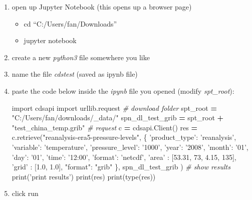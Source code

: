 \documentclass[
]{book}
\newenvironment{Shaded}{\begin{snugshade}}{\end{snugshade}}
\newcommand{\BuiltInTok}[1]{#1}
\newcommand{\CommentTok}[1]{\textcolor[rgb]{0.56,0.35,0.01}{\textit{#1}}}
\newcommand{\DecValTok}[1]{\textcolor[rgb]{0.00,0.00,0.81}{#1}}
\newcommand{\FloatTok}[1]{\textcolor[rgb]{0.00,0.00,0.81}{#1}}
\newcommand{\ImportTok}[1]{#1}
\newcommand{\NormalTok}[1]{#1}
\newcommand{\OperatorTok}[1]{\textcolor[rgb]{0.81,0.36,0.00}{\textbf{#1}}}
\newcommand{\StringTok}[1]{\textcolor[rgb]{0.31,0.60,0.02}{#1}}
\providecommand{\tightlist}{%
  \setlength{\itemsep}{0pt}\setlength{\parskip}{0pt}}
\begin{document}
\begin{enumerate}
\def\labelenumi{\arabic{enumi}.}
\item
  open up Jupyter Notebook (this opens up a browser page)

  \begin{itemize}
  \tightlist
  \item
    cd ``C:/Users/fan/Downloads''
  \item
    jupyter notebook
  \end{itemize}
\item
  create a new \emph{python3} file somewhere you like
\item
  name the file \emph{cdstest} (saved as ipynb file)
\item
  paste the code below inside the \emph{ipynb} file you opened (modify \emph{spt\_root}):

\begin{Shaded}
\begin{Highlighting}[]
\ImportTok{import}\NormalTok{ cdsapi}
\ImportTok{import}\NormalTok{ urllib.request}
\CommentTok{# download folder}
\NormalTok{spt_root }\OperatorTok{=} \StringTok{"C:/Users/fan/downloads/_data/"}
\NormalTok{spn_dl_test_grib }\OperatorTok{=}\NormalTok{ spt_root }\OperatorTok{+} \StringTok{"test_china_temp.grib"}
\CommentTok{# request}
\NormalTok{c }\OperatorTok{=}\NormalTok{ cdsapi.Client()}
\NormalTok{res }\OperatorTok{=}\NormalTok{ c.retrieve(}\StringTok{"reanalysis-era5-pressure-levels"}\NormalTok{,}
\NormalTok{  \{}
    \StringTok{'product_type'}\NormalTok{: }\StringTok{'reanalysis'}\NormalTok{,}
    \StringTok{'variable'}\NormalTok{: }\StringTok{'temperature'}\NormalTok{,}
    \StringTok{'pressure_level'}\NormalTok{: }\StringTok{'1000'}\NormalTok{,}
    \StringTok{'year'}\NormalTok{: }\StringTok{'2008'}\NormalTok{,}
    \StringTok{'month'}\NormalTok{: }\StringTok{'01'}\NormalTok{,}
    \StringTok{'day'}\NormalTok{: }\StringTok{'01'}\NormalTok{,}
    \StringTok{'time'}\NormalTok{: }\StringTok{'12:00'}\NormalTok{,}
    \StringTok{'format'}\NormalTok{: }\StringTok{'netcdf'}\NormalTok{,}
    \StringTok{'area'}\NormalTok{          : [}\FloatTok{53.31}\NormalTok{, }\DecValTok{73}\NormalTok{, }\FloatTok{4.15}\NormalTok{, }\DecValTok{135}\NormalTok{],}
    \StringTok{'grid'}\NormalTok{          : [}\FloatTok{1.0}\NormalTok{, }\FloatTok{1.0}\NormalTok{],}
    \StringTok{"format"}\NormalTok{: }\StringTok{"grib"}
\NormalTok{  \},}
\NormalTok{  spn_dl_test_grib}
\NormalTok{)}
\CommentTok{# show results}
\BuiltInTok{print}\NormalTok{(}\StringTok{'print results'}\NormalTok{)}
\BuiltInTok{print}\NormalTok{(res)}
\BuiltInTok{print}\NormalTok{(}\BuiltInTok{type}\NormalTok{(res))}
\end{Highlighting}
\end{Shaded}
\item
  click run
\end{enumerate}
\end{document}
